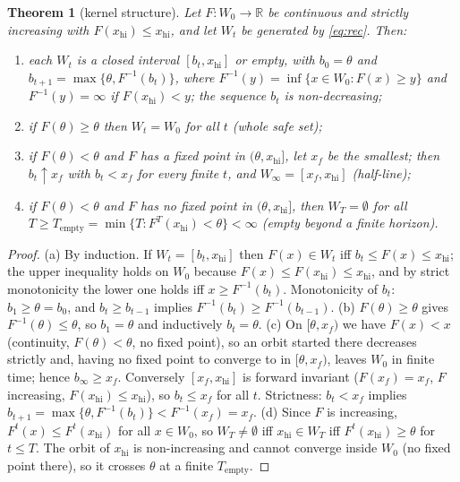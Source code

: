 \documentclass[11pt,a4paper]{article}
\theoremstyle{plain}
\newtheorem{theorem}{Theorem}[section]
\theoremstyle{definition}
\theoremstyle{remark}
\newcommand{\R}{\mathbb{R}}
\newcommand{\safe}{W_0}
\newcommand{\LRP}{\theta}
\newcommand{\Tempty}{T_{\mathrm{empty}}}
\begin{document}
\begin{theorem}[kernel structure]\label{thm:kernel}
Let $F:\safe\to\R$ be continuous and strictly increasing with $F(x_{\mathrm{hi}})\le x_{\mathrm{hi}}$, and let $W_t$ be generated by \eqref{eq:rec}. Then:
\begin{enumerate}[label=(\alph*)]
\item each $W_t$ is a closed interval $[b_t,x_{\mathrm{hi}}]$ or empty, with $b_0=\LRP$ and $b_{t+1}=\max\{\LRP,F^{-1}(b_t)\}$, where $F^{-1}(y)=\inf\{x\in\safe:F(x)\ge y\}$ and $F^{-1}(y)=\infty$ if $F(x_{\mathrm{hi}})<y$; the sequence $b_t$ is non-decreasing;
\item if $F(\LRP)\ge\LRP$ then $W_t=\safe$ for all $t$ (\emph{whole safe set});
\item if $F(\LRP)<\LRP$ and $F$ has a fixed point in $(\LRP,x_{\mathrm{hi}}]$, let $x_f$ be the smallest; then $b_t\uparrow x_f$ with $b_t<x_f$ for every finite $t$, and $W_\infty=[x_f,x_{\mathrm{hi}}]$ (\emph{half-line});
\item if $F(\LRP)<\LRP$ and $F$ has no fixed point in $(\LRP,x_{\mathrm{hi}}]$, then $W_T=\emptyset$ for all $T\ge\Tempty=\min\{T:F^{T}(x_{\mathrm{hi}})<\LRP\}<\infty$ (\emph{empty beyond a finite horizon}).
\end{enumerate}
\end{theorem}
\begin{proof}
(a) By induction. If $W_t=[b_t,x_{\mathrm{hi}}]$ then $F(x)\in W_t$ iff $b_t\le F(x)\le x_{\mathrm{hi}}$; the upper inequality holds on $\safe$ because $F(x)\le F(x_{\mathrm{hi}})\le x_{\mathrm{hi}}$, and by strict monotonicity the lower one holds iff $x\ge F^{-1}(b_t)$. Monotonicity of $b_t$: $b_1\ge\LRP=b_0$, and $b_t\ge b_{t-1}$ implies $F^{-1}(b_t)\ge F^{-1}(b_{t-1})$. (b) $F(\LRP)\ge\LRP$ gives $F^{-1}(\LRP)\le\LRP$, so $b_1=\LRP$ and inductively $b_t=\LRP$. (c) On $[\LRP,x_f)$ we have $F(x)<x$ (continuity, $F(\LRP)<\LRP$, no fixed point), so an orbit started there decreases strictly and, having no fixed point to converge to in $[\LRP,x_f)$, leaves $\safe$ in finite time; hence $b_\infty\ge x_f$. Conversely $[x_f,x_{\mathrm{hi}}]$ is forward invariant ($F(x_f)=x_f$, $F$ increasing, $F(x_{\mathrm{hi}})\le x_{\mathrm{hi}}$), so $b_t\le x_f$ for all $t$. Strictness: $b_t<x_f$ implies $b_{t+1}=\max\{\LRP,F^{-1}(b_t)\}<F^{-1}(x_f)=x_f$. (d) Since $F$ is increasing, $F^{t}(x)\le F^{t}(x_{\mathrm{hi}})$ for all $x\in\safe$, so $W_T\neq\emptyset$ iff $x_{\mathrm{hi}}\in W_T$ iff $F^{t}(x_{\mathrm{hi}})\ge\LRP$ for $t\le T$. The orbit of $x_{\mathrm{hi}}$ is non-increasing and cannot converge inside $\safe$ (no fixed point there), so it crosses $\LRP$ at a finite $\Tempty$.
\end{proof}
\end{document}
